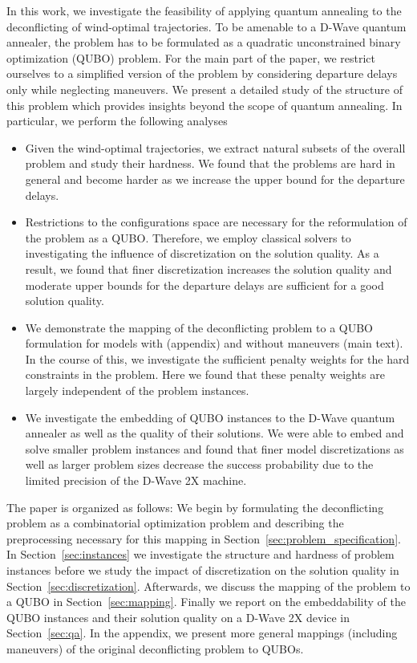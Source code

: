 {
\color{red} 
In this work, we investigate the feasibility of applying quantum annealing to the deconflicting of wind-optimal trajectories. 
To be amenable to a D-Wave quantum annealer, the problem has to be formulated as a quadratic unconstrained binary optimization (QUBO) problem.
For the main part of the paper, we restrict ourselves to a simplified version of the problem by considering departure delays only while neglecting maneuvers.
We present a detailed study of the structure of this problem which provides insights beyond the scope of quantum annealing.
In particular, we perform the following analyses


\begin{itemize}
    \item
    Given the wind-optimal trajectories, we extract natural subsets of the overall problem and study their hardness.
    We found that the problems are hard in general and become harder as we increase the upper bound for the departure delays.

    \item
    Restrictions to the configurations space are necessary for the reformulation of the problem as a QUBO.
    Therefore, we employ classical solvers to investigating the influence of discretization on the solution quality.
    As a result, we found that finer discretization increases the solution quality and moderate upper bounds for the departure delays are sufficient for a good solution quality.

    \item
    We demonstrate the mapping of the deconflicting problem to a QUBO formulation for models with (appendix) and without maneuvers (main text).
    In the course of this, we investigate the sufficient penalty weights for the hard constraints in the problem.
    Here we found that these penalty weights are largely independent of the problem instances.

    \item
    We investigate the embedding of QUBO instances to the D-Wave quantum annealer as well as the quality of their solutions. 
    We were able to embed and solve smaller problem instances and found that finer model discretizations as well as larger problem sizes decrease the success probability due to the limited precision of the D-Wave 2X machine.

\end{itemize}

The paper is organized as follows:
We begin by formulating the deconflicting problem as a combinatorial optimization problem and describing the preprocessing necessary for this mapping in Section~\ref{sec:problem_specification}.
In Section~\ref{sec:instances} we investigate the structure and hardness of problem instances before we study the impact of discretization on the solution quality in Section~\ref{sec:discretization}.
Afterwards, we discuss the mapping of the problem to a QUBO in Section~\ref{sec:mapping}.
Finally we report on the embeddability of the QUBO instances and their solution quality on a D-Wave 2X device in Section~\ref{sec:qa}.
In the appendix, we present more general mappings (including maneuvers) of the original deconflicting problem to QUBOs.
}
